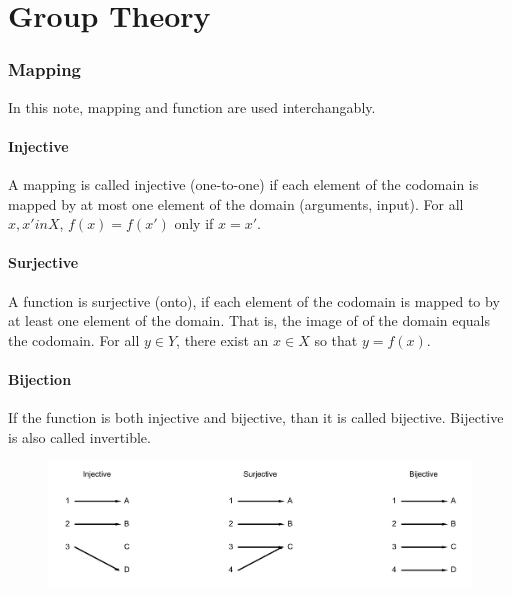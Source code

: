 \documentclass{amsart}
\theoremstyle{remark}
\theoremstyle{remark}
\theoremstyle{definition}
\begin{document}
\part{Group Theory}

\section*{Mapping}
In this note, mapping and function are used interchangably. 
\subsection*{Injective}
A mapping is called injective (one-to-one) if each element of the codomain is mapped by 
at most one element of the domain (arguments, input). 
For all $x,x' in X$, $f(x)=f(x')$ only if $x=x'$.

\subsection*{Surjective}
A function is surjective (onto), if each element of the codomain is mapped to by at least one element of 
the domain. That is, the image of of the domain equals the codomain. 
For all $y\in Y$, there exist an $x\in X$ so that $y=f(x)$.

\subsection*{Bijection}
If the function is both injective and bijective, than it is called bijective. Bijective is also called invertible.

\begin{figure}[h!]
    \centering
    \includegraphics[width = 5in]{figures/mapping.png}
\end{figure}

\vspace{10pt}
\end{document}
